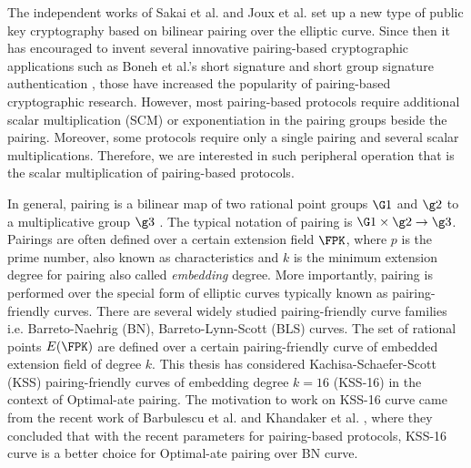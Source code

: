 The independent works of  Sakai et al. \cite{sakai2000cryptosystems} and Joux et al. \cite{JC:Joux04} set up a new type of public key cryptography based on bilinear pairing over the elliptic curve.
Since then it has encouraged to invent several innovative pairing-based cryptographic applications such as Boneh et al.'s short signature \cite{AC:BonLynSha01} and short group signature authentication \cite{C:BonBoySha04}, those have increased the popularity of pairing-based cryptographic research.
However, most pairing-based protocols require additional scalar multiplication (SCM) or exponentiation in the pairing groups beside the pairing.
Moreover, some protocols \cite{AC:Groth10a} require only a single pairing and several scalar multiplications. 
Therefore, we are interested in such peripheral operation that is the scalar multiplication of pairing-based protocols.

In general, pairing is a bilinear map of two rational point groups $\G1$ and $\g2$ to a multiplicative group $\g3$ \cite{Silverman}.
The typical notation of pairing is $\G1 \times \g2 \rightarrow \g3$.
Pairings are often defined over a certain extension field $\FPK$, where $p$ is the prime number, also known as characteristics  and $k$  is the minimum extension degree for pairing also called \textit{embedding} degree. 
More importantly, pairing is performed over the special form of elliptic curves typically known as pairing-friendly curves.
There are several widely studied pairing-friendly curve families i.e. Barreto-Naehrig (BN), Barreto-Lynn-Scott (BLS) curves\cite{JC:FreScoTes10}. 
The set of rational points $E(\FPK)$ are defined over a certain pairing-friendly curve of embedded extension field of degree $k$.
This thesis has considered Kachisa-Schaefer-Scott (KSS) \cite{EPRINT:KacSchSco07} pairing-friendly curves of embedding degree $k=16$ (KSS-16) in the context of Optimal-ate pairing.
The motivation to work on KSS-16 curve came from the recent work of Barbulescu et al. \cite{sylvain_new_param} and Khandaker et al. \cite{INDOCRYPT:KNGDNK17}, where they concluded that with the recent parameters for pairing-based protocols, KSS-16 curve is a better choice for Optimal-ate pairing over BN curve.

